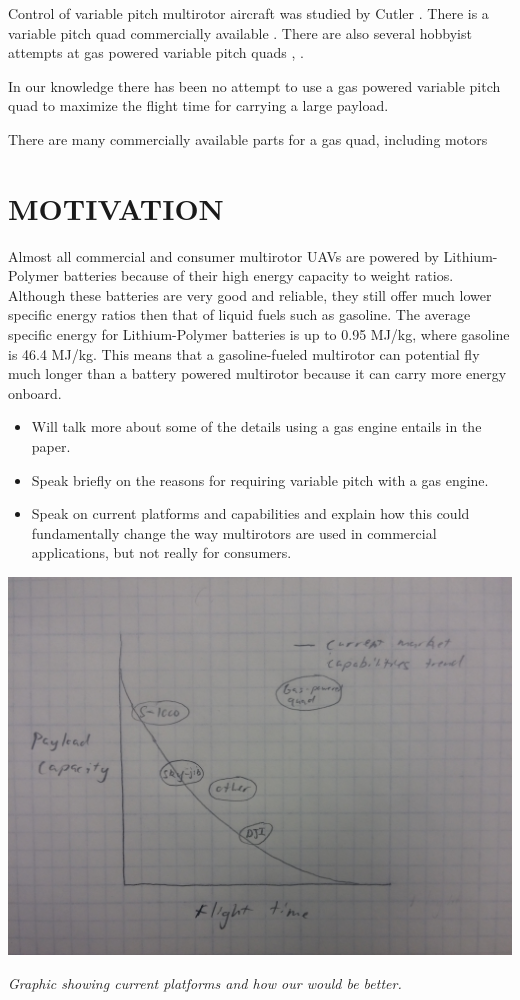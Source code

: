 \documentclass[letterpaper, 10 pt, conference]{ieeeconf}  %
\makeatletter
\newenvironment{figurehere}
  {\def\@captype{figure}}
  {}
\makeatother
\begin{document}
Control of variable pitch multirotor aircraft was studied by Cutler \cite{Cutler2012}. There is a variable pitch quad commercially available \cite{stingray2016}.  There are also several hobbyist attempts at gas powered variable pitch quads \cite{diy2016}, \cite{hackaday2016}.

In our knowledge there has been no attempt to use a gas powered variable pitch quad to maximize the flight time for carrying a large payload. 

There are many commercially available parts for a gas quad, including motors 

\section{MOTIVATION}

Almost all commercial and consumer multirotor UAVs are powered by Lithium-Polymer batteries because of their high energy capacity to weight ratios. Although these batteries are very good and reliable, they still offer much lower specific energy ratios then that of liquid fuels such as gasoline. The average specific energy for Lithium-Polymer batteries is up to 0.95 MJ/kg, where gasoline is 46.4 MJ/kg. This means that a gasoline-fueled multirotor can potential fly much longer than a battery powered multirotor because it can carry more energy onboard. 

\begin{itemize}
	\item{Will talk more about some of the details using a gas engine entails in the paper.}
	\item{Speak briefly on the reasons for requiring variable pitch with a gas engine.} 
	\item{Speak on current platforms and capabilities and explain how this could fundamentally change the way multirotors are used in commercial applications, but not really for consumers.}
\end{itemize}


\begin{figurehere}
	\begin{center}
		\includegraphics[width=.40\textwidth]{current_capabilities.jpg}
		\caption{\textit{Graphic showing current platforms and how our would be better.}}
		\label{current_cap}
	\end{center}
\end{figurehere}
\end{document}
